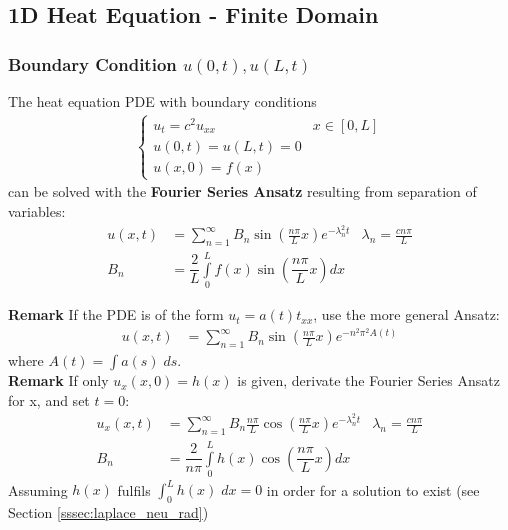 \subsection{1D Heat Equation - Finite Domain}\label{ssec:1d_heat_fin}
\subsubsection{Boundary Condition \texorpdfstring{$u(0,t), u(L,t)$}{u (0,t), u (L,t)}}
The heat equation PDE with boundary conditions
\begin{align*}
    \begin{cases}
        u_t=c^2u_{xx} & x\in[0,L] \\
        u(0,t)=u(L,t)=0           \\
        u(x,0)=f(x)
    \end{cases}
\end{align*}
can be solved with the \textbf{Fourier Series Ansatz} resulting
from separation of variables:
\begin{align*}
    u(x,t) & =\sum_{n=1}^\infty B_n\sin(\frac{n\pi}Lx)e^{-\lambda_n^2t} & \lambda_n = \frac{cn\pi}{L} \\
    B_n    & =\dfrac{2}{L}\int\limits_0^{L}f(x)\sin(\dfrac{n\pi}{L}x)dx
\end{align*}

\textbf{Remark} If the PDE is of the form $u_t=a(t)t_{xx}$, use the more general Ansatz:
\begin{align*}
    u(x,t) & =\sum_{n=1}^\infty B_n\sin(\frac{n\pi}Lx)e^{-n^2\pi^2A(t)}
\end{align*}
where $A(t)=\int a(s)\;ds$.\\

\textbf{Remark} If only $u_x(x,0)=h(x)$ is given, derivate the Fourier Series Ansatz for x, and set $t=0$:
\begin{align*}
    u_x(x,t) & =\sum_{n=1}^\infty B_n \frac{n\pi}L\cos(\frac{n\pi}Lx)e^{-\lambda_n^2t} & \lambda_n = \frac{cn\pi}{L} \\
    B_n      & =\dfrac{2}{n\pi}\int\limits_0^{L}h(x)\cos(\dfrac{n\pi}{L}x)dx
\end{align*}
Assuming $h(x)$ fulfils $\int_{0}^{L}h(x)\;dx = 0$ in order for a solution to exist (see Section \ref{sssec:laplace_neu_rad})

